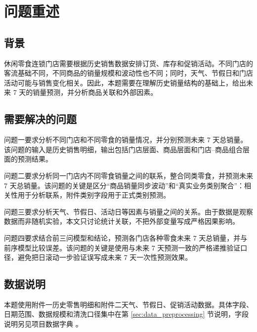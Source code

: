 \section{问题重述}

\subsection{背景}

休闲零食连锁门店需要根据历史销售数据安排订货、库存和促销活动。不同门店的客流基础不同，不同商品的销量规模和波动性也不同；同时，天气、节假日和门店活动可能与销售变化相关。因此，本题需要在理解历史销量结构的基础上，给出未来 7 天的销量预测，并分析商品关联和外部因素。

\subsection{需要解决的问题}

问题一要求分析不同门店和不同零食的销量情况，并分别预测未来 7 天总销量。该问题的输入是历史销售明细，输出包括门店层面、商品层面和门店--商品组合层面的预测结果。

问题二要求分析同一门店内不同零食销量之间的联系，整合同类零食，并预测未来 7 天总销量。该问题的关键是区分“商品销量同步波动”和“真实业务类别聚合”：相关性用于分析联系，附件类别字段用于正式类别预测。

问题三要求分析天气、节假日、活动日等因素与销量之间的关系。由于数据是观察数据而非随机实验，本文只讨论统计关联，不把外部变量写成严格因果影响。

问题四要求结合前三问模型和结论，预测各门店各种零食未来 7 天总销量，并与前序模型比较误差。该问题的关键是使用与未来 7 天预测一致的严格递推验证口径，避免把日滚动一步验证误写成未来 7 天一次性预测效果。

\subsection{数据说明}

本题使用附件一历史零售明细和附件二天气、节假日、促销活动数据。具体字段、日期范围、数据规模和清洗口径集中在第 \ref{sec:data_preprocessing} 节说明，字段说明另见项目数据字典 。
